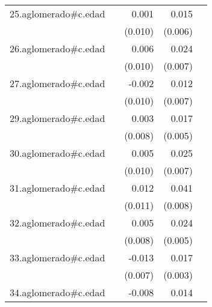 {\begin{longtable}{l*{4}{D{.}{.}{-1}}}
\addlinespace
25.aglomerado#c.edad&                     &       0.001         &       0.015\sym{*}  &                     \\
            &                     &     (0.010)         &     (0.006)         &                     \\
\addlinespace
26.aglomerado#c.edad&                     &       0.006         &       0.024\sym{***}&                     \\
            &                     &     (0.010)         &     (0.007)         &                     \\
\addlinespace
27.aglomerado#c.edad&                     &      -0.002         &       0.012         &                     \\
            &                     &     (0.010)         &     (0.007)         &                     \\
\addlinespace
29.aglomerado#c.edad&                     &       0.003         &       0.017\sym{***}&                     \\
            &                     &     (0.008)         &     (0.005)         &                     \\
\addlinespace
30.aglomerado#c.edad&                     &       0.005         &       0.025\sym{***}&                     \\
            &                     &     (0.010)         &     (0.007)         &                     \\
\addlinespace
31.aglomerado#c.edad&                     &       0.012         &       0.041\sym{***}&                     \\
            &                     &     (0.011)         &     (0.008)         &                     \\
\addlinespace
32.aglomerado#c.edad&                     &       0.005         &       0.024\sym{***}&                     \\
            &                     &     (0.008)         &     (0.005)         &                     \\
\addlinespace
33.aglomerado#c.edad&                     &      -0.013         &       0.017\sym{***}&                     \\
            &                     &     (0.007)         &     (0.003)         &                     \\
\addlinespace
34.aglomerado#c.edad&                     &      -0.008         &       0.014\sym{**} &                     \\

\end{longtable}}
